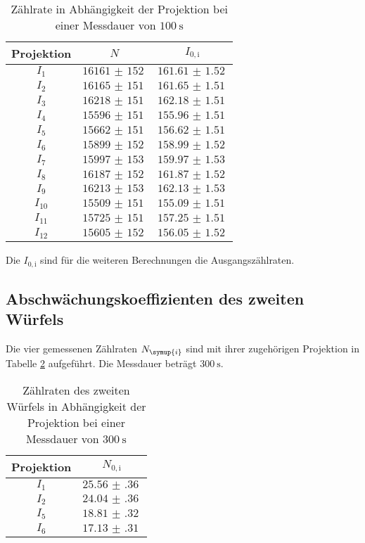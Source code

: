 \begin{table}[H]
  \centering
  \caption{Zählrate in Abhängigkeit der Projektion bei einer Messdauer von $\SI{100}{\second}$ }
  \label{tab:w1}
  \begin{tabular}{c c c}
    \toprule
    Projektion & $N$ & $I_{0,\mathrm{i}}$   \\
    \midrule
        $I_1$    & $\SI{16161(152)}{}$ & $\SI{161.61(152)}{}$    \\
        $I_2$    & $\SI{16165(151)}{}$ & $\SI{161.65(151)}{}$    \\
        $I_3$    & $\SI{16218(151)}{}$ & $\SI{162.18(151)}{}$    \\
        $I_4$    & $\SI{15596(151)}{}$ & $\SI{155.96(151)}{}$    \\
        $I_5$    & $\SI{15662(151)}{}$ & $\SI{156.62(151)}{}$    \\
        $I_6$    & $\SI{15899(152)}{}$ & $\SI{158.99(152)}{}$    \\
        $I_7$    & $\SI{15997(153)}{}$ & $\SI{159.97(153)}{}$    \\
        $I_8$    & $\SI{16187(152)}{}$ & $\SI{161.87(152)}{}$    \\
        $I_9$    & $\SI{16213(153)}{}$ & $\SI{162.13(153)}{}$    \\
        $I_{10}$ & $\SI{15509(151)}{}$ & $\SI{155.09(151)}{}$   \\
        $I_{11}$ & $\SI{15725(151)}{}$ & $\SI{157.25(151)}{}$    \\
        $I_{12}$ & $\SI{15605(152)}{}$ & $\SI{156.05(152)}{}$    \\
    \bottomrule
  \end{tabular}
\end{table}

Die $I_{0,\mathrm{i}}$ sind für die weiteren Berechnungen die Ausgangszählraten.


\subsection{Abschwächungskoeffizienten des zweiten Würfels}

Die vier gemessenen Zählraten $N_\symup{i}$ sind mit ihrer zugehörigen Projektion in Tabelle
\ref{tab:w2} aufgeführt. Die Messdauer beträgt $\SI{300}{\second}$.

\begin{table}[H]
  \centering
  \caption{Zählraten des zweiten Würfels in Abhängigkeit der Projektion bei einer Messdauer von $\SI{300}{\second}$ }
  \label{tab:w2}
  \begin{tabular}{c c}
    \toprule
    Projektion & $N_{0,\mathrm{i}}$   \\
    \midrule
        $I_1$    & $\SI{25.56(36)}{}$ \\
        $I_2$    & $\SI{24.04(36)}{}$ \\
        $I_5$    & $\SI{18.81(32)}{}$ \\
        $I_6$    & $\SI{17.13(31)}{}$ \\
    \bottomrule
  \end{tabular}
\end{table}

